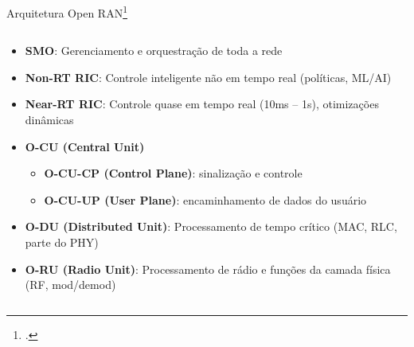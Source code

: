 \begin{frame}{Arquitetura Open RAN\footcite{marques2023desagregando}}
\begin{columns}
    \begin{column}{0.5\textwidth}
    \begin{itemize}
      \item \scriptsize \textbf{SMO}: Gerenciamento e orquestração de toda a rede
    
      \item \textbf{Non-RT RIC}: Controle inteligente não em tempo real (políticas, ML/AI)
    
      \item \textbf{Near-RT RIC}: Controle quase em tempo real (10ms – 1s), otimizações dinâmicas
    
      \item \scriptsize \textbf{O-CU (Central Unit)}
            \begin{itemize}
              \item \scriptsize \textbf{O-CU-CP (Control Plane)}: sinalização e controle  
              \item \scriptsize \textbf{O-CU-UP (User Plane)}: encaminhamento de dados do usuário  
            \end{itemize}
    
      \item \scriptsize \textbf{O-DU (Distributed Unit)}: Processamento de tempo crítico (MAC, RLC, parte do PHY)  

      \item \scriptsize \textbf{O-RU (Radio Unit)}:  Processamento de rádio e funções da camada física (RF, mod/demod)  


\end{itemize}
\end{column}
\end{columns}
\end{frame}
